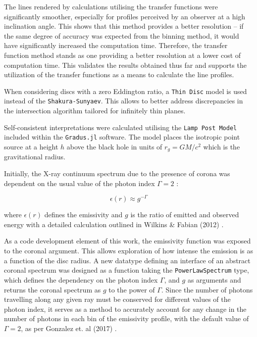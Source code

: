 \documentclass[fleqn,usenatbib,useAMS]{mnras}
\begin{document}
The lines rendered by calculations utilising the transfer functions were significantly smoother, especially for profiles perceived by an observer at a high inclination angle. This shows that this method provides a better resolution -- if the same degree of accuracy was expected from the binning method, it would have significantly increased the computation time. Therefore, the transfer function method stands as one providing a better resolution at a lower cost of computation time. This validates the results obtained thus far and supports the utilization of the transfer functions as a means to calculate the line profiles.

When considering discs with a zero Eddington ratio, a {\tt Thin Disc} model is used instead of the {\tt Shakura-Sunyaev}. This allows to better address discrepancies in the intersection algorithm tailored for infinitely thin planes. 

Self-consistent interpretations were calculated utilising the {\tt Lamp Post Model} included within the {\tt Gradus.jl} software. The model places the isotropic point source at a height $h$ above the black hole in units of $r_{g} = GM/c^{2}$ which is the gravitational radius. 

Initially, the X-ray continuum spectrum due to the presence of corona was dependent on the usual value of the photon index $\Gamma = 2$ \cite{wilkins2012understanding}:

\begin{equation}
    \epsilon(r) \approx g^{-\Gamma}
    \label{emissivity}
\end{equation}

where $\epsilon(r)$ defines the emissivity and $g$ is the ratio of emitted and observed energy with a detailed calculation outlined in Wilkins \& Fabian (2012) \cite{wilkins2012understanding}.

As a code development element of this work, the emissivity function was exposed to the coronal argument. This allows exploration of how intense the emission is as a function of the disc radius. A new datatype defining an interface of an abstract coronal spectrum was designed as a function taking the {\tt PowerLawSpectrum} type, which defines the dependency on the photon index $\Gamma$, and $g$ as arguments and returns the coronal 
spectrum as $g$ to the power of $\Gamma$. Since the number of photons travelling along any given ray must be conserved for different values of the photon index, it serves as a method to accurately account for any change in the number of photons in each bin of the emissivity profile, with the default value of $\Gamma = 2$, as
per Gonzalez et. al (2017) \cite{gonzalez2017probing}. 
\end{document}
